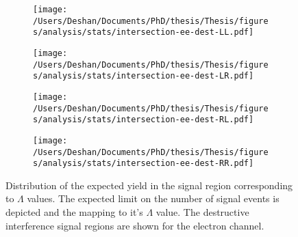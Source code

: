 \begin{figure}[h!]
    \centering
    \begin{subfigure}[b]{0.49\textwidth}
        \centering
        \texttt{[image: /Users/Deshan/Documents/PhD/thesis/Thesis/figures/analysis/stats/intersection-ee-dest-LL.pdf]}
        \label{fig:bkgmodel:interpee5}
    \end{subfigure}
    \begin{subfigure}[b]{0.49\textwidth}
        \centering
        \texttt{[image: /Users/Deshan/Documents/PhD/thesis/Thesis/figures/analysis/stats/intersection-ee-dest-LR.pdf]}
        \label{fig:bkgmodel:interpee6}
    \end{subfigure}
    \begin{subfigure}[b]{0.49\textwidth}
        \centering
        \texttt{[image: /Users/Deshan/Documents/PhD/thesis/Thesis/figures/analysis/stats/intersection-ee-dest-RL.pdf]}
        \label{fig:bkgmodel:interpee7}
    \end{subfigure}
    \begin{subfigure}[b]{0.49\textwidth}
        \centering
        \texttt{[image: /Users/Deshan/Documents/PhD/thesis/Thesis/figures/analysis/stats/intersection-ee-dest-RR.pdf]}
        \label{fig:bkgmodel:interpee8}
    \end{subfigure}
    \caption{Distribution of the expected yield in the signal region corresponding to $\Lambda$ values. The expected limit on the number of signal events is depicted and the mapping to it's $\Lambda$ value. The destructive interference signal regions are shown for the electron channel.}
    \label{fig:stats:interpeedest}
\end{figure}

